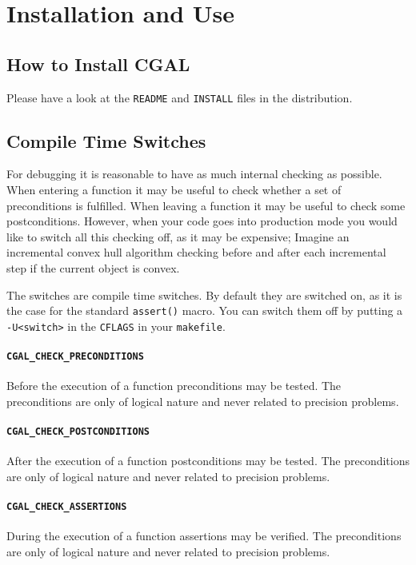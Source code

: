 
\chapter{Installation and Use}

\section{How to Install CGAL}
Please have a look at the {\tt README} and {\tt INSTALL} files
in the distribution.

\section{Compile Time Switches\label{CompilerFlags}}

For debugging it is reasonable to have as much internal checking as
possible.  When entering a function it may be useful to check whether
a set of preconditions is fulfilled. When leaving a function it may be 
useful to check some postconditions.  However, when your code goes into 
production mode you would like to switch all this checking 
off, as it may be expensive; Imagine an incremental convex hull algorithm
checking before and after each incremental step if the current object
is convex.

The switches are compile time switches.  By default they are switched on, 
as it is the case for the standard {\tt assert()} macro. You can switch them
off by putting a {\tt -U<switch>} in the {\tt CFLAGS} in your {\tt makefile}.

\subsubsection*{{\tt CGAL\_CHECK\_PRECONDITIONS}}
Before the execution of a function preconditions may be tested.
The preconditions are only of logical nature and never related to 
precision problems. 

\subsubsection*{{\tt CGAL\_CHECK\_POSTCONDITIONS}}
After the execution of a function postconditions may be tested.
The preconditions are only of logical nature and never related to 
precision problems.

\subsubsection*{{\tt CGAL\_CHECK\_ASSERTIONS}}
During the execution of a function assertions may be verified.
The preconditions are only of logical nature and never related to 
precision problems.

